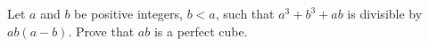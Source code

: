 Let $a$ and $b$ be positive integers, $b<a$,  such that $a^3+b^3+ab$ is divisible by $ab(a-b)$. Prove that $ab$ is a perfect cube.